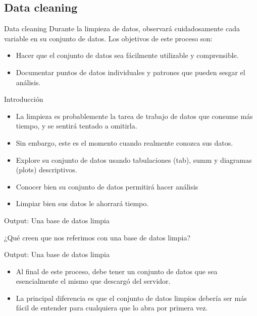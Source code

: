 \documentclass[10pt, aspectratio=169, compress]{beamer}
\begin{document}
\subsection{Data cleaning}
\begin{frame}[t]{Data cleaning}
	Durante la limpieza de datos, observará cuidadosamente cada variable en su conjunto de datos. Los objetivos de este proceso son:
	\begin{itemize}
	\item Hacer que el conjunto de datos sea fácilmente utilizable y comprensible.
	\item Documentar puntos de datos individuales y patrones que pueden sesgar el análisis.
	\end{itemize}
\end{frame}
\begin{frame}[t]{Introducción}
	\begin{itemize}
		\item La limpieza es probablemente la tarea de trabajo de datos que consume más tiempo, y se sentirá tentado a omitirla.
		\item Sin embargo, este es el momento cuando realmente conozca sus datos.
		\item Explore su conjunto de datos usando tabulaciones (tab), summ y diagramas (plots) descriptivos.
		\item Conocer bien su conjunto de datos permitirá hacer análisis
		\item Limpiar bien sus datos le ahorrará tiempo.
	\end{itemize}
\end{frame}
\begin{frame}{Output: Una base de datos limpia}
	\begin{center}
		¿Qué creen que nos referimos con una base de datos limpia? 
	\end{center}
\end{frame}
\begin{frame}[t]{Output: Una base de datos limpia}
	\begin{itemize}
		\item Al final de este proceso, debe tener un conjunto de datos que sea esencialmente el mismo que descargó del servidor.
		\item La principal diferencia es que el conjunto de datos limpios debería ser más fácil de entender para cualquiera que lo abra por primera vez.
	\end{itemize}
\end{frame}
\end{document}
